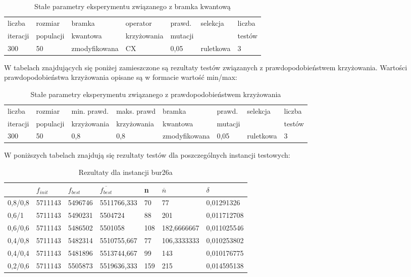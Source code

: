 \begin{table}[H]
\label{T3_params}
\begin{tabular}{l l l l l l l}
\hline
liczba & rozmiar & bramka & operator & prawd. & selekcja & liczba \\
iteracji & populacji & kwantowa & krzyżowania & mutacji & & testów \\
\hline
300 & 50 & zmodyfikowana & CX & 0,05 & ruletkowa & 3 \\
\hline
\end{tabular}
\caption{Stałe parametry eksperymentu związanego z bramka kwantową}
\end{table}

W tabelach znajdujących się poniżej zamieszczone są rezultaty testów związanych z prawdopodobieństwem krzyżowania. Wartości prawdopodobieństwa krzyżowania opisane są w formacie wartość min/max:

\begin{table}[H]
\label{T3_params}
\begin{tabular}{l l l l l l l l}
\hline
liczba & rozmiar & min. prawd. & maks. prawd & bramka & prawd. & selekcja & liczba \\
iteracji & populacji & krzyżowania & krzyżowania & kwantowa & mutacji & & testów \\
\hline
300 & 50 & 0,8 & 0,8 & zmodyfikowana & 0,05 & ruletkowa & 3 \\
\hline
\end{tabular}
\caption{Stałe parametry eksperymentu związanego z prawdopodobieństwem krzyżowania}
\end{table}

W poniższych tabelach znajdują się rezultaty testów dla poszczególnych instancji testowych:

\begin{table}[H]
\label{T3_bur26a}
\begin{tabular}{l l l l l l l}
\hline
 & $f_{init}$ & $f_{best}$ & $\overline{f_{best}}$ & n & $\overline{n}$ & $\delta$ \\
\hline
0,8/0,8 & 5711143 & 5496746 & 5511766,333 & 70 & 77 & 0,01291326\\
0,6/1 & 5711143 & 5490231 & 5504724 & 88 & 201 & 0,011712708\\
0,6/0,6 & 5711143 & 5486502 & 5501058 & 108 & 182,6666667 & 0,011025546\\
0,4/0,8 & 5711143 & 5482314 & 5510755,667 & 77 & 106,3333333 & 0,010253802\\
0,4/0,4 & 5711143 & 5481896 & 5513744,667 & 99 & 143 & 0,010176775\\
0,2/0,6 & 5711143 & 5505873 & 5519636,333 & 159 & 215 & 0,014595138\\
\hline
\end{tabular}
\caption{Rezultaty dla instancji bur26a}
\end{table}


